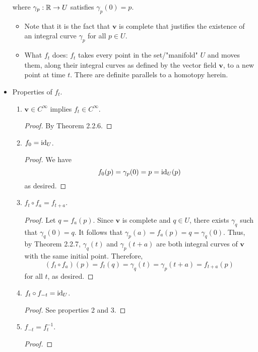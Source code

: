 \documentclass[../notes.tex]{subfiles}
\begin{document}
\begin{itemize}
    where $\gamma_p:\mathbb{R}\to U$ satisfies $\gamma_p(0)=p$.
    \begin{itemize}
        \item Note that it is the fact that $\bm{v}$ is complete that justifies the existence of an integral curve $\gamma_p$ for all $p\in U$.
        \item What $f_t$ does: $f_t$ takes every point in the set/"manifold" $U$ and moves them, along their integral curves as defined by the vector field $\bm{v}$, to a new point at time $t$. There are definite parallels to a homotopy herein.
    \end{itemize}
    \item Properties of $f_t$.
    \begin{enumerate}
        \item $\bm{v}\in C^\infty$ implies $f_t\in C^\infty$.
        \begin{proof}
            By Theorem 2.2.6.
        \end{proof}
        \item $f_0=\operatorname{id}_U$.
        \begin{proof}
            We have
            \begin{equation*}
                f_0(p) = \gamma_p(0) = p = \operatorname{id}_U(p)
            \end{equation*}
            as desired.
        \end{proof}
        \item $f_t\circ f_a=f_{t+a}$.
        \begin{proof}
            Let $q=f_a(p)$. Since $\bm{v}$ is complete and $q\in U$, there exists $\gamma_q$ such that $\gamma_q(0)=q$. It follows that $\gamma_p(a)=f_a(p)=q=\gamma_q(0)$. Thus, by Theorem 2.2.7, $\gamma_q(t)$ and $\gamma_p(t+a)$ are both integral curves of $\bm{v}$ with the same initial point. Therefore,
            \begin{equation*}
                (f_t\circ f_a)(p) = f_t(q)
                = \gamma_q(t)
                = \gamma_p(t+a)
                = f_{t+a}(p)
            \end{equation*}
            for all $t$, as desired.
        \end{proof}
        \item $f_t\circ f_{-t}=\operatorname{id}_U$.
        \begin{proof}
            See properties 2 and 3.
        \end{proof}
        \item $f_{-t}=f_t^{-1}$.
        \begin{proof}

\end{proof}
\end{enumerate}
\end{itemize}
\end{document}

